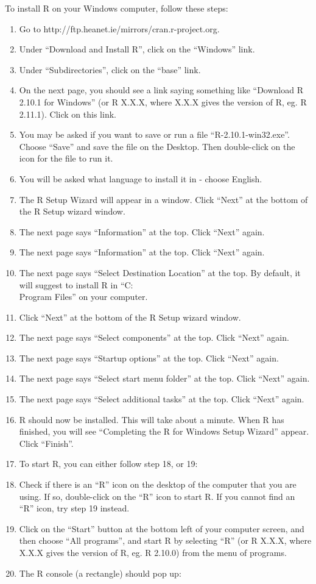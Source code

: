 \documentclass["../Applied_probabillity _and_statistics_lab_KTU.tex"]{subfiles}
\begin{document}
To install R on your Windows computer, follow these steps:
\begin{enumerate}


  \item   Go to http://ftp.heanet.ie/mirrors/cran.r-project.org.
    \item Under “Download and Install R”, click on the “Windows” link.
    \item Under “Subdirectories”, click on the “base” link.
    \item On the next page, you should see a link saying something like “Download R 2.10.1 for Windows” (or R X.X.X, where X.X.X gives the version of R, eg. R 2.11.1). Click on this link.
    \item You may be asked if you want to save or run a file “R-2.10.1-win32.exe”. Choose “Save” and save the file on the Desktop. Then double-click on the icon for the file to run it.
    \item You will be asked what language to install it in - choose English.
    \item The R Setup Wizard will appear in a window. Click “Next” at the bottom of the R Setup wizard window.
    \item The next page says “Information” at the top. Click “Next” again.
    \item The next page says “Information” at the top. Click “Next” again.
    \item The next page says “Select Destination Location” at the top. By default, it will suggest to install R in “C:\\Program Files” on your computer.
    \item Click “Next” at the bottom of the R Setup wizard window.
    \item The next page says “Select components” at the top. Click “Next” again.
    \item The next page says “Startup options” at the top. Click “Next” again.
    \item The next page says “Select start menu folder” at the top. Click “Next” again.
    \item The next page says “Select additional tasks” at the top. Click “Next” again.
    \item R should now be installed. This will take about a minute. When R has finished, you will see “Completing the R for Windows Setup Wizard” appear. Click “Finish”.
  \item   To start R, you can either follow step 18, or 19:
    \item Check if there is an “R” icon on the desktop of the computer that you are using. If so, double-click on the “R” icon to start R. If you cannot find an “R” icon, try step 19 instead.
    \item Click on the “Start” button at the bottom left of your computer screen, and then choose “All programs”, and start R by selecting “R” (or R X.X.X, where X.X.X gives the version of R, eg. R 2.10.0) from the menu of programs.
    \item The R console (a rectangle) should pop up:

  
  \end{enumerate}
\end{document}
